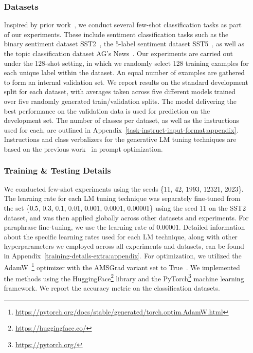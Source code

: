 \documentclass[11pt]{article}
\begin{document}
\subsubsection{Datasets}
Inspired by prior work~\cite{gao-etal-2021-making, deng-etal-2022-rlprompt}, we conduct several few-shot classification tasks as part of our experiments. These include sentiment classification tasks such as the binary sentiment dataset SST2~\cite{socher-etal-2013-recursive}, the 5-label sentiment dataset SST5~\cite{socher-etal-2013-recursive}, as well as the topic classification dataset AG's News~\cite{NIPS2015_250cf8b5}. Our experiments are carried out under the 128-shot setting, in which we randomly select 128 training examples for each unique label within the dataset. An equal number of examples are gathered to form an internal validation set. We report results on the standard development split for each dataset, with averages taken across five different models trained over five randomly generated train/validation splits. The model delivering the best performance on the validation data is used for prediction on the development set. The number of classes per dataset, as well as the instructions used for each, are outlined in Appendix~\ref{task-instruct-input-format:appendix}. Instructions and class verbalizers for the generative LM tuning techniques are based on the previous work~\cite{deng-etal-2022-rlprompt} in prompt optimization.
\subsubsection{Training \& Testing Details}
We conducted few-shot experiments using the seeds \{11, 42, 1993, 12321, 2023\}. The learning rate for each LM tuning technique was separately fine-tuned from the set \{0.5, 0.3, 0.1, 0.01, 0.001, 0.0001, 0.00001\} using the seed 11 on the SST2 dataset, and was then applied globally across other datasets and experiments. For paraphrase fine-tuning, we use the learning rate of 0.00001. Detailed information about the specific learning rates used for each LM technique, along with other hyperparameters we employed across all experiments and datasets, can be found in Appendix~\ref{training-details-extra:appendix}. For optimization, we utilized the AdamW~\cite{DBLP:journals/corr/abs-1711-05101}\footnote{\url{https://pytorch.org/docs/stable/generated/torch.optim.AdamW.html}} optimizer with the AMSGrad variant set to True~\cite{DBLP:journals/corr/abs-1904-09237}. We implemented the methods using the HuggingFace\footnote{\url{https://huggingface.co/}} library and the PyTorch\footnote{\url{https://pytorch.org/}} machine learning framework. We report the accuracy metric on the classification datasets.
\end{document}

